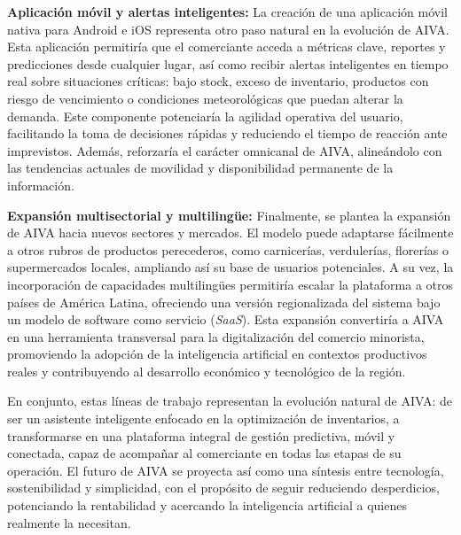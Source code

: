 \textbf{Aplicación móvil y alertas inteligentes:}  
La creación de una aplicación móvil nativa para Android e iOS representa otro paso natural en la evolución de AIVA. Esta aplicación permitiría que el comerciante acceda a métricas clave, reportes y predicciones desde cualquier lugar, así como recibir alertas inteligentes en tiempo real sobre situaciones críticas: bajo stock, exceso de inventario, productos con riesgo de vencimiento o condiciones meteorológicas que puedan alterar la demanda. Este componente potenciaría la agilidad operativa del usuario, facilitando la toma de decisiones rápidas y reduciendo el tiempo de reacción ante imprevistos. Además, reforzaría el carácter omnicanal de AIVA, alineándolo con las tendencias actuales de movilidad y disponibilidad permanente de la información.

\textbf{Expansión multisectorial y multilingüe:}  
Finalmente, se plantea la expansión de AIVA hacia nuevos sectores y mercados. El modelo puede adaptarse fácilmente a otros rubros de productos perecederos, como carnicerías, verdulerías, florerías o supermercados locales, ampliando así su base de usuarios potenciales. A su vez, la incorporación de capacidades multilingües permitiría escalar la plataforma a otros países de América Latina, ofreciendo una versión regionalizada del sistema bajo un modelo de software como servicio (\textit{SaaS}). Esta expansión convertiría a AIVA en una herramienta transversal para la digitalización del comercio minorista, promoviendo la adopción de la inteligencia artificial en contextos productivos reales y contribuyendo al desarrollo económico y tecnológico de la región.

En conjunto, estas líneas de trabajo representan la evolución natural de AIVA: de ser un asistente inteligente enfocado en la optimización de inventarios, a transformarse en una plataforma integral de gestión predictiva, móvil y conectada, capaz de acompañar al comerciante en todas las etapas de su operación. El futuro de AIVA se proyecta así como una síntesis entre tecnología, sostenibilidad y simplicidad, con el propósito de seguir reduciendo desperdicios, potenciando la rentabilidad y acercando la inteligencia artificial a quienes realmente la necesitan.




